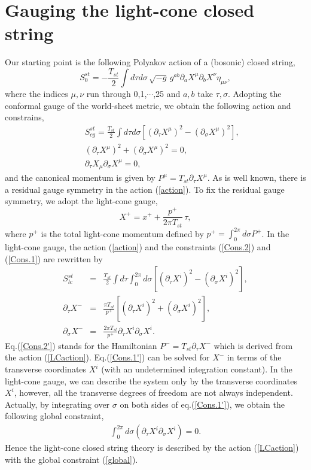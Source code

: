 \documentclass[12pt,a4paper]{article}
\newcommand{\ptau}{\partial_\tau}
\newcommand{\psig}{\partial_\sigma}
\newcommand{\p}{\partial}
\begin{document}
\section{Gauging the light-cone closed string}\label{secLCT}
Our starting point is the following Polyakov action of a (bosonic)
closed string,
\begin{equation}
  S_0^{st}=-\frac{T_{st}}{2}\int d\tau d\sigma\,\sqrt{-g}\,
  g^{ab}\p_a X^{\mu}\p_b X^{\nu}\eta_{\mu\nu},
\end{equation}
where the indices $\mu,\nu$ run through 0,1,$\cdots$,25
and $a,b$ take $\tau,\sigma$.
Adopting the conformal gauge of the world-sheet metric,
we obtain the following action and constrains,
\begin{eqnarray}
&&S_{cg}^{st}=\frac{T_{st}}{2}\int d\tau d\sigma\left[
	(\ptau X^{\mu})^2-(\psig X^{\mu})^2
	\right]\label{action},\\
&&(\ptau X^{\mu})^2 + ( \psig X^{\mu})^2=0\label{Cons.2},\\
&&\ptau X_{\mu} \psig X^{\mu}=0\label{Cons.1},
\end{eqnarray}
and the canonical momentum is given by $P^{\mu}=T_{st}\ptau X^{\mu}$.
As is well known, there is a residual gauge symmetry in the action
(\ref{action}). To fix the residual gauge symmetry,
we adopt the light-cone gauge,
\begin{equation}
  X^{+}=x^+ + \frac{p^+}{2\pi T_{st}}\,\tau,
\end{equation}
where $p^{+}$ is the total light-cone momentum
defined by $p^{+}=\int_0^{2\pi}d\sigma P^{+}$.
In the light-cone gauge, the action (\ref{action}) and the constraints
(\ref{Cons.2}) and (\ref{Cons.1}) are rewritten by
\begin{eqnarray}
  S_{lc}^{st}&=&\frac{T_{st}}{2}\int d\tau \int_0^{2\pi}d\sigma\left[
	(\ptau X^i)^2-(\psig X^i)^2\right]\label{LCaction},\\
  \ptau X^{-}&=&\frac{\pi T_{st}}{p^+}\left[(\ptau X^i)^2
	 + ( \psig X^{i})^2\right],\label{Cons.2'}\\
  \psig X^{-}&=&\frac{2\pi T_{st}}{p^+}\ptau X^i
	\psig X^i.\label{Cons.1'}
\end{eqnarray}
Eq.(\ref{Cons.2'}) stands for the Hamiltonian $P^-=T_{st}\ptau
X^-$ which is derived from the action (\ref{LCaction}).
Eq.(\ref{Cons.1'}) can be solved for $X^-$ in terms of the transverse
coordinates $X^i$ (with an undetermined integration constant).
In the light-cone gauge, we can describe the system only by the
transverse coordinates $X^i$, however, all the transverse degrees of
freedom are not always independent. Actually, by integrating over
$\sigma$ on both sides of eq.(\ref{Cons.1'}), we obtain the following
global constraint,
\begin{eqnarray}
  \int_0^{2\pi} d\sigma (\ptau X^i\psig X^i)=0.\label{global}
\end{eqnarray}
Hence the light-cone closed string theory is described by the action
(\ref{LCaction}) with the global constraint (\ref{global}).
\end{document}
